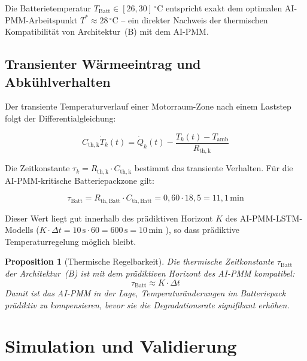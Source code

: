 ﻿\documentclass[12pt,a4paper]{article}
\newtheorem{proposition}[theorem]{Proposition}
\begin{document}
Die Batterietemperatur $T_\mathrm{Batt} \in [26, 30]\,^\circ\mathrm{C}$ entspricht
exakt dem optimalen AI-PMM-Arbeitspunkt $T^* \approx 28\,^\circ\mathrm{C}$
\cite{Epp2026liion} -- ein direkter Nachweis der thermischen Kompatibilität von
Architektur~(B) mit dem AI-PMM.

\subsection{Transienter Wärmeeintrag und Abkühlverhalten}

Der transiente Temperaturverlauf einer Motorraum-Zone nach einem Laststep
folgt der Differentialgleichung:

\begin{equation}
	C_\mathrm{th,k} \dot{T}_k(t) = \dot{Q}_k(t) - \frac{T_k(t) - T_\mathrm{amb}}{R_\mathrm{th,k}}
	\label{eq:transient_eq}
\end{equation}

Die Zeitkonstante $\tau_k = R_\mathrm{th,k} \cdot C_\mathrm{th,k}$ bestimmt
das transiente Verhalten. Für die AI-PMM-kritische Batteriepackzone gilt:

\begin{equation}
	\tau_\mathrm{Batt} = R_\mathrm{th,Batt} \cdot C_\mathrm{th,Batt}
	= 0{,}60 \cdot 18{,}5 = 11{,}1\,\mathrm{min}
	\label{eq:tau_batt}
\end{equation}

Dieser Wert liegt gut innerhalb des prädiktiven Horizont $K$ des AI-PMM-LSTM-Modells
($K \cdot \Delta t = 10\,\mathrm{s} \cdot 60 = 600\,\mathrm{s} = 10\,\mathrm{min}$
\cite{Epp2026liion}), so dass prädiktive Temperaturregelung möglich bleibt.

\begin{proposition}[Thermische Regelbarkeit]
	\label{prop:regelbarkeit}
	Die thermische Zeitkonstante $\tau_\mathrm{Batt}$ der Architektur~(B) ist
	mit dem prädiktiven Horizont des AI-PMM kompatibel:
	\begin{equation}
		\tau_\mathrm{Batt} \approx K \cdot \Delta t
		\label{eq:tau_kompatibel}
	\end{equation}
	Damit ist das AI-PMM in der Lage, Temperaturänderungen im Batteriepack
	prädiktiv zu kompensieren, bevor sie die Degradationsrate signifikant erhöhen.
\end{proposition}

\section{Simulation und Validierung}
\label{sec:simulation}
\end{document}
